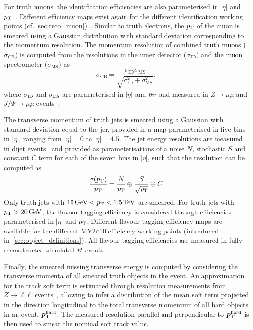 For truth muons, the identification efficiencies are also parameterised in $\vert\eta\vert$ and $p_{\mathrm{T}}$~\cite{Aad:2020gmm}. Different efficiency maps exist again for the different identification working points (cf. \cref{sec:reco_muon})~\cite{Aad:2020gmm}. Similar to truth electrons, the  $p_{\mathrm{T}}$ of the muon is smeared using a Gaussian distribution with standard deviation corresponding to the momentum resolution. The momentum resolution of combined truth muons ($\sigma_\mathrm{CB}$) is computed from the resolutions in the inner detector ($\sigma_\mathrm{ID}$) and the muon spectrometer ($\sigma_\mathrm{MS}$) as
\begin{equation}
	\sigma_\mathrm{CB} = \frac{\sigma_\mathrm{ID}\sigma_\mathrm{MS}}{\sqrt{\sigma_\mathrm{ID}^2 + \sigma_\mathrm{MS}^2}},
\end{equation}
where $\sigma_\mathrm{ID}$ and $\sigma_\mathrm{MS}$ are parameterised in $\vert\eta\vert$ and $p_{\mathrm{T}}$ and measured in $Z\to \mu\mu$ and $J/\Psi\to \mu\mu$ events~\cite{PERF-2015-10}.

The transverse momentum of truth jets is smeared using a Gaussian with standard deviation equal to the \gls{jer}, provided in a map parameterised in five bins in $\vert\eta\vert$, ranging from $\vert\eta\vert = 0$ to $\vert\eta\vert = 4.5$. The jet energy resolutions are measured in dijet events~\cite{Aad:2020flx} and provided as parameterisations of a noise $N$, stochastic $S$ and constant $C$ term for each of the seven bins in $\vert\eta\vert$, such that the resolution can be computed as
\begin{equation}
	\frac{\sigma(p_{\mathrm{T}})}{p_{\mathrm{T}}} = \frac{N}{p_{\mathrm{T}}}\oplus\frac{S}{\sqrt{p_{\mathrm{T}}}}\oplus C.
\end{equation}
Only truth jets with $\SI{10}{\GeV} < \pt < \SI{1.5}{\TeV}$ are smeared. For truth jets with $\pt > \SI{20}{\GeV}$, the flavour tagging efficiency is considered through efficiencies parameterised in $\vert\eta\vert$ and $p_{\mathrm{T}}$. Different flavour tagging efficiency maps are available for the different \textsc{MV2c10} efficiency working points (introduced in~\cref{sec:object_definitions}). All flavour tagging efficiencies are measured in fully reconstructed simulated $t\bar{t}$ events~\cite{FTAG-2018-01}.

Finally, the smeared missing transverse energy is computed by considering the transverse momenta of all smeared truth objects in the event. An approximation for the track soft term is estimated through resolution measurements from $Z\rightarrow \ell\ell$ events~\cite{ATLAS-CONF-2018-023}, allowing to infer a distribution of the mean soft term projected in the direction longitudinal to the total transverse momentum of all hard objects in an event, $\makemebold{p}_\mathrm{T}^\mathrm{hard}$. The measured resolution parallel and perpendicular to $\makemebold{p}_\mathrm{T}^\mathrm{hard}$ is then used to smear the nominal soft track value.

